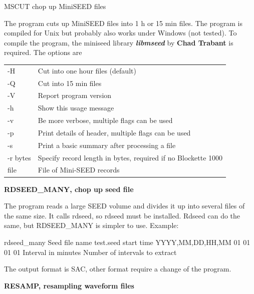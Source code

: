 MSCUT chop up MiniSEED files 

The program cuts up MiniSEED files into 1 h or 15 min files.  The 
program is compiled for Unix but probably also works under Windows 
(not tested). To compile the program, the miniseed library 
\textit{\textbf{libmseed}} by \textbf{Chad Trabant} is required. The options are 

\begin{tabular}{ll}
-H & Cut into one hour files (default) \\
-Q & Cut into 15 min files \\
-V & Report program version \\
-h & Show this usage message \\
-v & Be more verbose, multiple flags can be used \\
-p & Print details of header, multiple flags can be used \\
-s        &      Print a basic summary after processing a file \\
-r bytes & Specify record length in bytes, required if no Blockette 1000\\
file & File of Mini-SEED records \\
\end{tabular}

\textbf{RDSEED\_MANY, chop up seed file}

The program reads a large SEED volume and divides it up into several files 
of the same size. It calls rdseed, so rdseed must be installed. Rdseed 
can do the same, but RDSEED\_MANY is simpler to use. \newline
Example: 

rdseed\_many \newline
Seed file name \newline
test.seed \newline
start time YYYY,MM,DD,HH,MM  01 01 01 01 \newline
Interval in minutes  \newline
Number of intervals to extract  

The output format is SAC, other format require a change of the program. 

\textbf{RESAMP, resampling waveform files}

